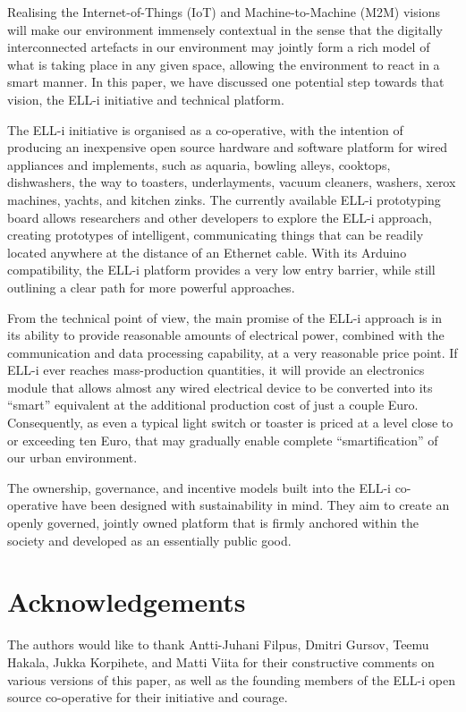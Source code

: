 \documentclass{siamltex}
\begin{document}
Realising the Internet-of-Things (IoT) and Machine-to-Machi\-ne (M2M)
visions will make our environment immensely contextual in the sense
that the digitally interconnected artefacts in our environment may
jointly form a rich model of what is taking place in any given space,
allowing the environment to react in a smart manner.  In this paper,
we have discussed one potential step towards that vision, the ELL-i
initiative and technical platform.

The ELL-i initiative is organised as a co-operative, with the
intention of producing an inexpensive open source hardware and software
platform for wired appliances and implements, such as aquaria, bowling
alleys, cooktops, dishwashers, the way to toasters, underlayments,
vacuum cleaners, washers, xerox machines, yachts, and kitchen zinks.
The currently available ELL-i prototyping board allows researchers and
other developers to explore the ELL-i approach, creating prototypes of
intelligent, communicating things that can be readily located anywhere
at the distance of an Ethernet cable.  With its Arduino compatibility,
the ELL-i platform provides a very low entry barrier, while still
outlining a clear path for more powerful approaches.

From the technical point of view, the main promise of the ELL-i
approach is in its ability to provide reasonable amounts of electrical
power, combined with the communication and data processing capability,
at a very reasonable price point.  If ELL-i ever reaches
mass-production quantities, it will provide an electronics module that
allows almost any wired electrical device to be converted into its
``smart'' equivalent at the additional production cost of just a
couple Euro.  Consequently, as even a typical light switch or toaster
is priced at a level close to or exceeding ten Euro, that may
gradually enable complete ``smartification'' of our urban
environment. 

The ownership, governance, and incentive models built into the ELL-i
co-operative have been designed with sustainability in mind.  They aim
to create an openly governed, jointly owned platform that is firmly
anchored within the society and developed as an essentially public good.

\section*{Acknowledgements}

The authors would like to thank Antti-Juhani Filpus, Dmitri Gursov,
Teemu Hakala, Jukka Korpihete, and Matti Viita for their constructive
comments on various versions of this paper, as well as the founding
members of the ELL-i open source co-operative for their initiative and
courage.

{}

\end{document}
